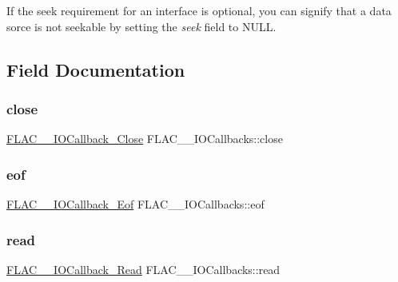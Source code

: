 If the seek requirement for an interface is optional, you can signify that a data sorce is not seekable by setting the {\itshape seek} field to {\ttfamily N\+U\+LL}. 

\subsection{Field Documentation}
\mbox{\label{struct_f_l_a_c_____i_o_callbacks_a8e447ae1999d9da9ebad5417f47223be}} 
\subsubsection{\texorpdfstring{close}{close}}
{\footnotesize\ttfamily \hyperlink{group__flac__callbacks_ga0032267fac38220689778833e08f7387}{F\+L\+A\+C\+\_\+\+\_\+\+I\+O\+Callback\+\_\+\+Close} F\+L\+A\+C\+\_\+\+\_\+\+I\+O\+Callbacks\+::close}

\mbox{\label{struct_f_l_a_c_____i_o_callbacks_a4810838b77667dc02415c854b2103e66}} 
\subsubsection{\texorpdfstring{eof}{eof}}
{\footnotesize\ttfamily \hyperlink{group__flac__callbacks_ga00ae3b3d373e691908e9539ebf720675}{F\+L\+A\+C\+\_\+\+\_\+\+I\+O\+Callback\+\_\+\+Eof} F\+L\+A\+C\+\_\+\+\_\+\+I\+O\+Callbacks\+::eof}

\mbox{\label{struct_f_l_a_c_____i_o_callbacks_a6dd767bc254e31dc47c9a0d218e72190}} 
\subsubsection{\texorpdfstring{read}{read}}
{\footnotesize\ttfamily \hyperlink{group__flac__callbacks_ga49d95218a6c09b215cd92cc96de71bf9}{F\+L\+A\+C\+\_\+\+\_\+\+I\+O\+Callback\+\_\+\+Read} F\+L\+A\+C\+\_\+\+\_\+\+I\+O\+Callbacks\+::read}

